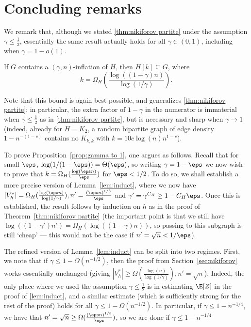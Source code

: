 \section{Concluding remarks}\label{sec:conclusion}
We remark that, although we stated \cref{thm:nikiforov partite} under the assumption $\gamma \leq \frac 12$, essentially the same result actually holds for all $\gamma \in (0,1)$, including when $\gamma = 1-o(1)$. 
\begin{proposition}\label{prop:gamma to 1}
    If $G$ contains a $(\gamma,n)$-inflation of $H$, then $H[k]\subseteq G$, where
    \[
    k = \Omega_H \left( \frac{\log((1-\gamma)n)}{\log(1/\gamma)}\right).
    \]
\end{proposition}
Note that this bound is again best possible, and generalizes \cref{thm:nikiforov partite}; in particular, the extra factor of $1-\gamma$ in the numerator is immaterial when $\gamma \leq \frac 12$ as in \cref{thm:nikiforov partite}, but is necessary and sharp when $\gamma \to 1$ (indeed, already for $H=K_2$, a random bipartite graph of edge density $1-n^{-(1-c)}$ contains no $K_{k,k}$ with $k=10c\log(n)n^{1-c}$). 



To prove Proposition~\ref{prop:gamma to 1}, one argues as follows.
Recall that for small $\eps$, $\log(1/(1-\eps)) = \Theta(\eps)$, so writing $\gamma = 1-\eps$ we now wish to prove that $k = \Omega_H( \frac{\log(\eps n)}{\eps})$ for $\eps<1/2$. 
To do so, we shall establish a more precise version of Lemma~\ref{lem:induct}, where we now have $|V_h^*| = \Omega_H(\frac{\log(\eps n)}{\log(1/\gamma)}), n'= \frac{(\eps n)^{1/3}}{\eps}$ and $\gamma' = \gamma^{C_H}\ge 1-C_H\eps$. Once this is established, the result follows by induction on $h$ as in the proof of Theorem~\ref{thm:nikiforov partite} (the important point is that we still have $\log((1-\gamma')n') = \Omega_H(\log((1-\gamma)n))$, so passing to this subgraph is still `cheap' --- this would not be the case if $n' = \sqrt{n}<1/\eps$).

The refined version of Lemma~\ref{lem:induct} can be split into two regimes. First, we note that if $\gamma \le 1-\Omega(n^{-1/2})$, then the proof from Section~\ref{sec:nikiforov} works essentially unchanged (giving $|V_h^*| \ge \Omega(\frac{\log(n)}{\log(1/\gamma)}),n' = \sqrt{n}$). Indeed, the only place where we used the assumption $\gamma \leq \frac 12$ is in estimating $\E[Z]$ in the proof of \cref{lem:induct}, and a similar estimate (which is sufficiently strong for the rest of the proof) holds for all $\gamma \leq 1-\Omega(n^{-1/2})$. In particular, if $\gamma \le 1-n^{-1/4}$, we have that $n' =\sqrt{n} \ge \Omega(\frac{(\eps n)^{1/3}}{\eps})$, so we are done if $\gamma \le 1-n^{-1/4}$

